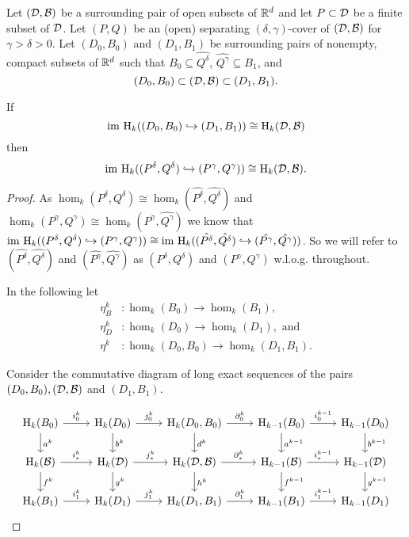 
\begin{theorem}\label{thm:main}
  Let $({\mathcal{D}}, {\mathcal{B}})$ be a surrounding pair of open subsets of $\mathbb{R}^d$ and let $P\subset {\mathcal{D}}$ be a finite subset of ${\mathcal{D}}$.
  Let $(P, Q)$ be an (open) separating $(\delta,\gamma)$-cover of $({\mathcal{D}}, {\mathcal{B}})$ for $\gamma > \delta > 0$.
  Let $(D_0, B_0)$ and $(D_1, B_1)$ be surrounding pairs of nonempty, compact subsets of $\mathbb{R}^d$ such that $B_0\subseteq \hat{Q^\delta}$, $\hat{Q^\gamma}\subseteq B_1$, and
  \[ (D_0, B_0)\subset ({\mathcal{D}}, {\mathcal{B}}) \subset (D_1, B_1).\]

  If
  \[\mathrm{im}~\mathrm{H}_k((D_0, B_0)\hookrightarrow (D_1, B_1))\cong \mathrm{H}_k({\mathcal{D}}, {\mathcal{B}})\]
  then
  \[\mathrm{im}~\mathrm{H}_k((P^\delta, Q^\delta)\hookrightarrow (P^\gamma, Q^\gamma))\cong \mathrm{H}_k({\mathcal{D}}, {\mathcal{B}}).\]
\end{theorem}
\begin{proof}
  As $\hom_k(P^\delta, Q^\delta)\cong \hom_k(\hat{P^\delta}, \hat{Q^\delta})$ and $\hom_k(P^\gamma, Q^\gamma)\cong \hom_k(\hat{P^\gamma}, \hat{Q^\gamma})$ we know that $\mathrm{im}~\mathrm{H}_k((P^\delta, Q^\delta)\hookrightarrow (P^\gamma, Q^\gamma))\cong \mathrm{im}~\mathrm{H}_k((\hat{P^\delta}, \hat{Q^\delta})\hookrightarrow (\hat{P^\gamma}, \hat{Q^\gamma}))$.
  So we will refer to $(\hat{P^\delta}, \hat{Q^\delta})$ and $(\hat{P^\gamma}, \hat{Q^\gamma})$ as $(P^\delta, Q^\delta)$ and $(P^\gamma, Q^\gamma)$ w.l.o.g. throughout.

  In the following let
  \begin{align*}
    \eta_B^k &: \hom_k(B_0)\to \hom_k(B_1),\\
    \eta_D^k &: \hom_k(D_0)\to \hom_k(D_1),\text{ and }\\
    \eta^k &: \hom_k(D_0, B_0)\to \hom_k(D_1, B_1).
  \end{align*}

  Consider the commutative diagram of long exact sequences of the pairs $(D_0, B_0), ({\mathcal{D}}, {\mathcal{B}})$ and $(D_1, B_1)$.

  \begin{equation}\begin{tikzcd}
      \hom_k(B_0)\arrow{r}{i^k_0}\arrow{d}{a^k} &
      \hom_k(D_0)\arrow{r}{j^k_0} \arrow{d}{b^k} &
      \hom_k(D_0, B_0)\arrow{r}{\partial^k_0}\arrow{d}{d^k} &
      \hom_{k-1}(B_0)\arrow{r}{i^{k-1}_0}\arrow{d}{a^{k-1}} &
      \hom_{k-1}(D_0) \arrow{d}{b^{k-1}}\\
      \hom_k(\B)\arrow{r}{i_*^k}\arrow{d}{f^k} &
      \hom_k(\D)\arrow{r}{j_*^k}\arrow{d}{g^k} &
      \hom_k(\D, \B)\arrow{r}{\partial_*^k}\arrow{d}{h^k} &
      \hom_{k-1}(\B)\arrow{r}{i_*^{k-1}}\arrow{d}{f^{k-1}} &
      \hom_{k-1}(\D)\arrow{d}{g^{k-1}}\\
      \hom_k(B_1)\arrow{r}{i^k_1} &
      \hom_k(D_1)\arrow{r}{j^k_1} &
      \hom_k(D_1, B_1)\arrow{r}{\partial^k_1} &
      \hom_{k-1}(B_1)\arrow{r}{i^{k-1}_1} &
      \hom_{k-1}(D_1)
  \end{tikzcd}\end{equation}


\end{proof}

